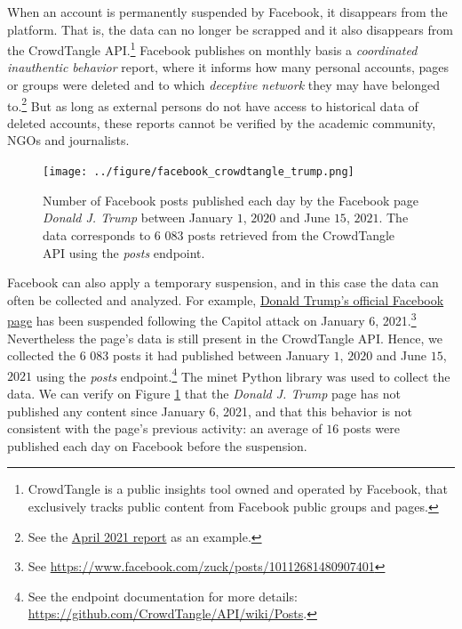 \documentclass{article}
\begin{document}
When an account is permanently suspended by Facebook, it disappears from the platform. That is,  the data can no longer be scrapped and it also disappears from the CrowdTangle API.\footnote{CrowdTangle is a public insights tool owned and operated by Facebook, that exclusively tracks public content from Facebook public groups and pages.} Facebook publishes on monthly basis a {\it coordinated inauthentic behavior} report, where it informs how many personal accounts, pages or groups were deleted and to which {\it deceptive network} they may have belonged to.\footnote{See the \href{https://about.fb.com/news/2021/05/april-2021-coordinated-inauthentic-behavior-report/}{April 2021 report} as an example.} 
But as long as external persons do not have access to historical data of deleted accounts, these reports cannot be verified by the academic community, NGOs and journalists.

\begin{figure}[h]
	\centering
			\texttt{[image: ../figure/facebook\_crowdtangle\_trump.png]}
	\caption{Number of Facebook posts published each day by the Facebook page {\it Donald J. Trump} between January $1$, $2020$ and June $15$, $2021$. The data corresponds to $6$ $083$ posts retrieved from the CrowdTangle API using the {\it posts} endpoint.}
	\label{fig1_fb}
\end{figure}

Facebook can also apply a temporary suspension, and in this case the data can often be collected and analyzed. For example, \href{https://www.facebook.com/DonaldTrump/}{Donald Trump’s official Facebook page}  has been suspended following the Capitol attack on January 6, 2021.\footnote{See \href{https://www.facebook.com/zuck/posts/10112681480907401}{https://www.facebook.com/zuck/posts/10112681480907401}} Nevertheless the page’s data is still present in the CrowdTangle API. 
Hence, we collected the $6$ $083$ posts it had published between January $1$, $2020$ and June $15$, $2021$ using the {\it posts} endpoint.\footnote{See the endpoint documentation for more details: \href{https://github.com/CrowdTangle/API/wiki/Posts}{https://github.com/CrowdTangle/API/wiki/Posts}.} The minet Python library\cite{minet} was used to collect the data. We can verify on Figure \ref{fig1_fb} that the {\it Donald J. Trump} page has not published any content since January $6$, 2021, and that this behavior is not consistent with the page’s previous activity: an average of $16$ posts were published each day on Facebook before the suspension. 
\end{document}
